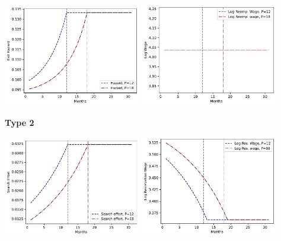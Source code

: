 \documentclass[letter, 10pt]{article}
\begin{document}
\includegraphics[clip=true,trim=0cm 0cm 0cm 0cm,width = 0.45\textwidth]{figures_Est1_compiled/fig_type1_hazard.pdf} 
\includegraphics[clip=true,trim=0cm 0cm 0cm 0cm,width = 0.45\textwidth]{figures_Est1_compiled/fig_type1_w.pdf} 

\pagebreak 
 \textbf{Type 2} 
 
\includegraphics[clip=true,trim=0cm 0cm 0cm 0cm,width = 0.45\textwidth]{figures_Est1_compiled/fig_type2_s.pdf} 
\includegraphics[clip=true,trim=0cm 0cm 0cm 0cm,width = 0.45\textwidth]{figures_Est1_compiled/fig_type2_phi.pdf} 
\end{document}
